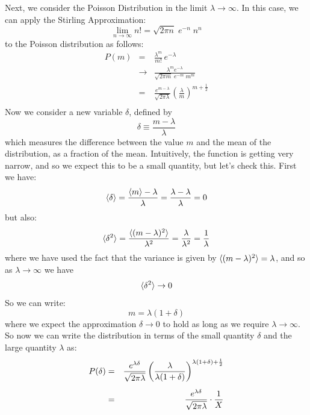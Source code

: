 \documentclass[12pt]{article}
\begin{document}
Next, we consider the Poisson Distribution in the limit $\lambda \to \infty$.  In this case, we can apply the Stirling Approximation:
\begin{displaymath}
\lim_{n \to \infty} n! = \sqrt{2 \pi n} \; e^{-n} \; n^n
\end{displaymath}
to the Poisson distribution as follows:
\begin{eqnarray*}
P(m) &=& \frac{\lambda^m}{m!} \, e^{-\lambda} \\[5pt]
 &\to& \frac{\lambda^m e^{-\lambda}}{\sqrt{2 \pi m} \; e^{-m} \; m^m} \\[5pt]
 &=& \frac{e^{m-\lambda}}{\sqrt{2\pi\lambda}} \left( \frac{\lambda}{m}\right)^{m+\frac{1}{2}}\\
\end{eqnarray*}
Now we consider a new variable $\delta$, defined by
\begin{displaymath}
\delta \equiv \frac{m-\lambda}{\lambda}
\end{displaymath}
which measures the difference between the value $m$ and the mean of the distribution, as a fraction of the mean.  Intuitively, the function is getting very narrow, and so we expect this to be a small quantity, but let's check this.  First we have:
\begin{displaymath}
\braket{\delta} = \frac{\braket{m}- \lambda}{\lambda} = \frac{\lambda - \lambda}{\lambda} = 0
\end{displaymath}
but also:
\begin{displaymath}
\braket{\delta^2} = \frac{\braket{(m-\lambda)^2}}{\lambda^2} = \frac{\lambda}{\lambda^2} = \frac{1}{\lambda}
\end{displaymath}
where we have used the fact that the variance is given by $\braket{(m-\lambda)^2} = \lambda$, and so as $\lambda \to \infty $ we have
\begin{displaymath}
\braket{\delta^2} \to 0
\end{displaymath}
So we can write:
\begin{equation} \label{eqn:mdef}
m = \lambda (1 + \delta)
\end{equation}
where we expect the approximation $\delta \to 0$ to hold as long as we require $\lambda \to \infty$.  So now we can write the distribution in terms of the small quantity $\delta$ and the large quantity $\lambda$ as:
\begin{eqnarray}
\label{eqn:pdelt}
P(\delta) &=& \frac{e^{\lambda\delta}}{\sqrt{2\pi\lambda}} \left( \frac{\lambda}{\lambda (1+\delta)} \right)^{\lambda(1+\delta)+\frac{1}{2}} \notag \\[5pt]
 &=& \frac{e^{\lambda\delta}}{\sqrt{2\pi\lambda}} \cdot \frac{1}{X}
\end{eqnarray}
\end{document}

